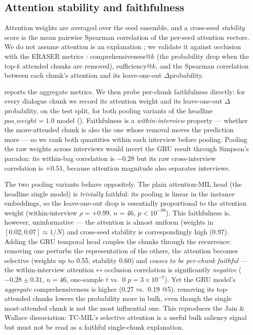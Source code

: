 \documentclass[conference]{IEEEtran}
\begin{document}
\subsection{Attention stability and faithfulness}
Attention weights are averaged over the seed ensemble, and a cross-seed
\emph{stability} score is the mean pairwise Spearman correlation of the
per-seed attention vectors. We do not assume attention is an explanation
\cite{jain2019}; we validate it against occlusion with the ERASER metrics
\cite{deyoung2020}: comprehensiveness@$k$ (the probability drop when the top-$k$
attended chunks are removed), sufficiency@$k$, and the Spearman correlation
between each chunk's attention and its leave-one-out $\Delta$probability.

 reports the aggregate metrics. We then probe per-chunk
faithfulness directly: for every dialogue chunk we record its attention weight
and its leave-one-out $\Delta$probability, on the test split, for both pooling
variants of the headline $pos\_weight\!=\!1.0$ model ().
Faithfulness is a \emph{within-interview} property --- whether the
more-attended chunk is also the one whose removal moves the prediction more ---
so we rank both quantities within each interview before pooling. Pooling the
raw weights across interviews would invert the GRU result through Simpson's
paradox: its within-bag correlation is $-0.28$ but its raw cross-interview
correlation is $+0.51$, because attention magnitude also separates interviews.

The two pooling variants behave oppositely. The plain attention-MIL head (the
headline single model) is \emph{trivially} faithful: its pooling is linear in
the instance embeddings, so the leave-one-out drop is essentially proportional
to the attention weight (within-interview $\rho=+0.99$, $n=46$,
$p<10^{-99}$). This faithfulness is, however, uninformative --- the attention
is almost uniform (weights in $[0.02,0.07]\approx 1/N$) and cross-seed
stability is correspondingly high (0.97). Adding the GRU temporal head couples
the chunks through the recurrence: removing one perturbs the representation of
the others, the attention becomes selective (weights up to 0.55, stability
0.60) and \emph{ceases to be per-chunk faithful} --- the within-interview
attention$\leftrightarrow$occlusion correlation is significantly
\emph{negative} ($-0.28\pm0.31$, $n=46$, one-sample $t$ vs.\ 0
$p=3\!\times\!10^{-7}$). Yet the GRU model's \emph{aggregate} comprehensiveness
is higher (0.27 vs.\ 0.19 @5): removing its top-attended chunks lowers the
probability more in bulk, even though the single most-attended chunk is not the
most influential one. This reproduces the Jain \& Wallace dissociation: TC-MIL's
selective attention is a useful bulk saliency signal but must not be read as a
faithful single-chunk explanation.
\end{document}
